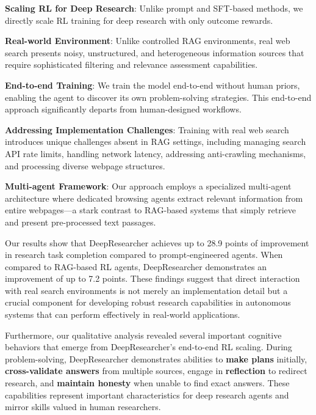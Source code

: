 \documentclass{article}
\newenvironment{itemize*}%
 {\leftmargini=10pt\begin{itemize}%
  \setlength{\itemsep}{0pt}%
  \setlength{\parskip}{0pt}%
  }%
 {\end{itemize}}
\newcommand{\scrl}{DeepResearcher\xspace}
\begin{document}
\begin{itemize*}
\item \textbf{Scaling RL for Deep Research}: Unlike prompt and SFT-based methods, we directly scale RL training for deep research with only outcome rewards.
\item \textbf{Real-world Environment}: Unlike controlled RAG environments, real web search presents noisy, unstructured, and heterogeneous information sources that require sophisticated filtering and relevance assessment capabilities.
\item \textbf{End-to-end Training}: We train the model end-to-end without human priors, enabling the agent to discover its own problem-solving strategies. This end-to-end approach significantly departs from human-designed workflows.
\item \textbf{Addressing Implementation Challenges}: Training with real web search introduces unique challenges absent in RAG settings, including managing search API rate limits, handling network latency, addressing anti-crawling mechanisms, and processing diverse webpage structures.
\item \textbf{Multi-agent Framework}: Our approach employs a specialized multi-agent architecture where dedicated browsing agents extract relevant information from entire webpages—a stark contrast to RAG-based systems that simply retrieve and present pre-processed text passages.
\end{itemize*}

Our results show that \scrl achieves up to 28.9 points of improvement in research task completion compared to prompt-engineered agents. When compared to RAG-based RL agents, \scrl demonstrates an improvement of up to 7.2 points. These findings suggest that direct interaction with real search environments is not merely an implementation detail but a crucial component for developing robust research capabilities in autonomous systems that can perform effectively in real-world applications.


Furthermore, our qualitative analysis revealed several important cognitive behaviors that emerge from \scrl's end-to-end RL scaling. During problem-solving, \scrl demonstrates abilities to \textbf{make plans} initially, \textbf{cross-validate answers} from multiple sources, engage in \textbf{reflection} to redirect research, and \textbf{maintain honesty} when unable to find exact answers. These capabilities represent important characteristics for deep research agents and mirror skills valued in human researchers.
\end{document}
